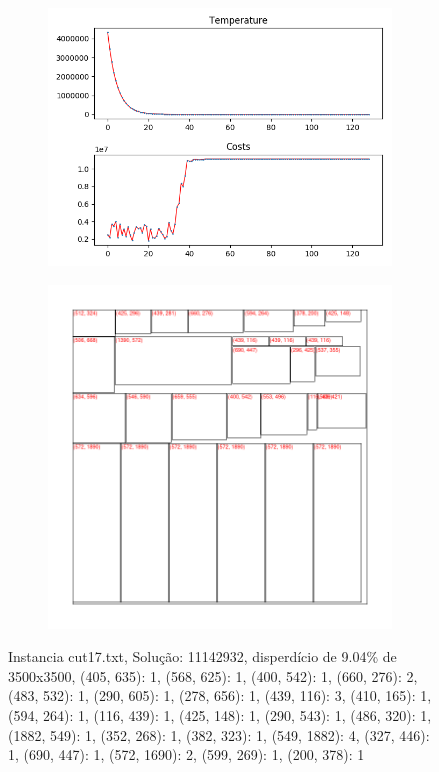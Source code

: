 \begin{figure}
\centering
\begin{subfigure}{.5\textwidth}
  \centering
  \includegraphics[width=1\linewidth]{results/cut17/2/plot}
  \label{fig:sub1}
\end{subfigure}%
\begin{subfigure}{.5\textwidth}
  \centering
  \includegraphics[width=1\linewidth]{results/cut17/2/cut}
  \label{fig:sub2}
\end{subfigure}
\caption{Instancia cut17.txt, Solução: 11142932, disperdício de 9.04\% de 3500x3500, {(405, 635): 1, (568, 625): 1, (400, 542): 1, (660, 276): 2, (483, 532): 1, (290, 605): 1, (278, 656): 1, (439, 116): 3, (410, 165): 1, (594, 264): 1, (116, 439): 1, (425, 148): 1, (290, 543): 1, (486, 320): 1, (1882, 549): 1, (352, 268): 1, (382, 323): 1, (549, 1882): 4, (327, 446): 1, (690, 447): 1, (572, 1690): 2, (599, 269): 1, (200, 378): 1}}
\label{fig:test}
\end{figure}



